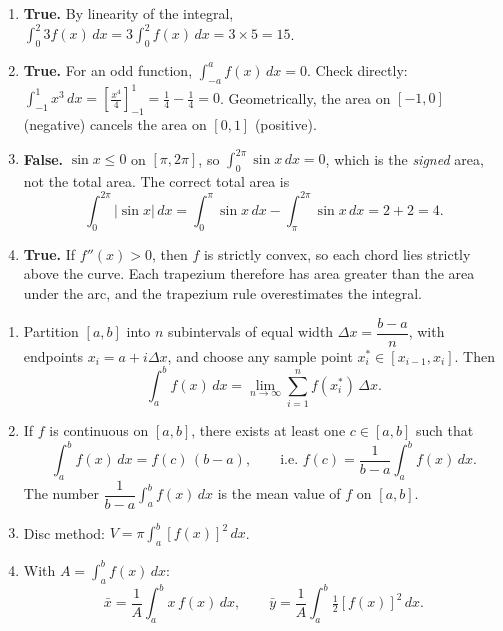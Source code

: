 \documentclass[11pt]{article}
\newcommand{\cle}[1]{{\popxbold\color{popdark}#1}}
\begin{document}
\begin{corrige}
\begin{enumerate}
\item \textbf{True.} By linearity of the integral, $\int_0^2 3f(x)\,dx = 3\int_0^2 f(x)\,dx = 3\times 5 = 15$.
\item \textbf{True.} For an odd function, $\int_{-a}^{a} f(x)\,dx = 0$. Check directly: $\int_{-1}^1 x^3\,dx = \left[\frac{x^4}{4}\right]_{-1}^1 = \frac14 - \frac14 = 0$. Geometrically, the area on $[-1,0]$ (negative) cancels the area on $[0,1]$ (positive).
\item \textbf{False.} $\sin x \le 0$ on $[\pi, 2\pi]$, so $\int_0^{2\pi}\sin x\,dx = 0$, which is the \emph{signed} area, not the total area. The correct total area is
\[
\int_0^{2\pi}|\sin x|\,dx = \int_0^{\pi}\sin x\,dx - \int_{\pi}^{2\pi}\sin x\,dx = 2+2 = 4.
\]
\item \textbf{True.} If $f''(x) > 0$, then $f$ is strictly convex, so each chord lies strictly above the curve. Each trapezium therefore has area greater than the area under the arc, and the trapezium rule overestimates the integral.
\end{enumerate}
\end{corrige}

\begin{corrige}
\begin{enumerate}
\item Partition $[a,b]$ into $n$ subintervals of equal width $\Delta x = \dfrac{b-a}{n}$, with endpoints $x_i = a + i\Delta x$, and choose any sample point $x_i^* \in [x_{i-1}, x_i]$. Then
\[
\int_a^b f(x)\,dx = \lim_{n\to\infty}\sum_{i=1}^{n} f(x_i^*)\,\Delta x .
\]
\item If $f$ is continuous on $[a,b]$, there exists at least one $c\in[a,b]$ such that
\[
\int_a^b f(x)\,dx = f(c)\,(b-a), \qquad\text{i.e. } f(c) = \frac{1}{b-a}\int_a^b f(x)\,dx .
\]
The number $\dfrac{1}{b-a}\displaystyle\int_a^b f(x)\,dx$ is the \cle{mean value} of $f$ on $[a,b]$.
\item Disc method: $\displaystyle V = \pi\int_a^b [f(x)]^2\,dx$.
\item With $A = \displaystyle\int_a^b f(x)\,dx$:
\[
\bar{x} = \frac{1}{A}\int_a^b x\,f(x)\,dx, \qquad \bar{y} = \frac{1}{A}\int_a^b \tfrac12 [f(x)]^2\,dx .
\]
\end{enumerate}
\end{corrige}
\end{document}
